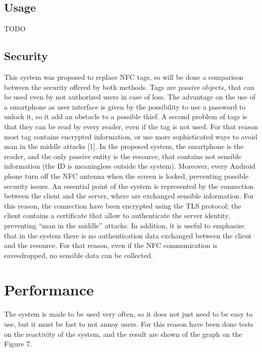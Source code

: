 \documentclass[conference]{IEEEtran}
\begin{document}
\subsection{Usage}

TODO

\subsection{Security}

This system was proposed to replace NFC tags, so will be done a comparison between the security offered by both methods.
Tags are passive objects, that can be used even by not authorized users in case of loss. The advantage on the use of a smartphone as user interface is given by the possibility to use a password to unlock it, so it add an obstacle to a possible thief.
A second problem of tags is that they can be read by every reader, even if the tag is not used. For that reason most tag contains encrypted information, or use more sophisticated ways to avoid man in the middle attacks [1].
In the proposed system, the smartphone is the reader, and the only passive entity is the resource, that contains not sensible information (the ID is meaningless outside the system). Moreover, every Android phone turn off the NFC antenna when the screen is locked, preventing possible security issues.
An essential point of the system is represented by the connection between the client and the server, where are exchanged sensible information. For this reason, the connection have been encrypted using the TLS protocol; the client contains a certificate that allow to authenticate the server identity, preventing ``man in the middle'' attacks.
In addition, it is useful to emphasize that in the system there is no authentication data exchanged between the client and the resource. For that reason, even if the NFC communication is eavesdropped, no sensible data can be collected.

\section{Performance}

The system is made to be used very often, so it does not just need to be easy to use, but it must be fast to not annoy users. For this reason have been done tests on the reactivity of the system, and the result are shown of the graph on the Figure 7.
\end{document}
